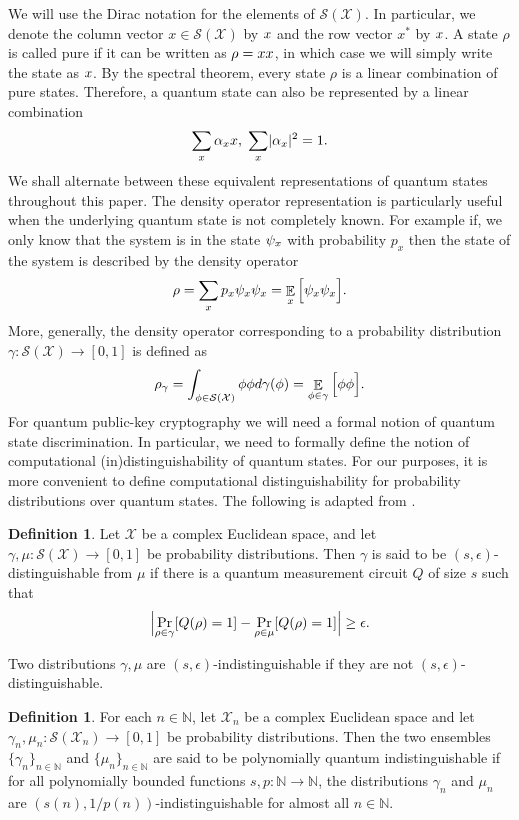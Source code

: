 \documentclass[11pt]{article}
\theoremstyle{plain}
\theoremstyle{definition}
\newtheorem{definition}[theorem]{Definition}
\DeclareMathOperator{\E}{\mathbb{E}}
\DeclarePairedDelimiter{\abs}{\lvert}{\rvert}
\let\ket\relax
\DeclarePairedDelimiter{\ket}{\lvert}{\rangle}
\let\bra\relax
\DeclarePairedDelimiter{\bra}{\langle}{\rvert}
\def\N{\mathbb{N}}
\def\X{\mathcal{X}}
\def\SX{\mathcal{S(X)}}
\begin{document}
We will use the Dirac notation for the elements of $\SX$. In particular, we denote the column vector $x \in \SX$ by $\ket{x}$ and the row vector $x^*$ by $\bra{x}$. A state $\rho$ is called pure if it can be written as $\rho = \ket{x}\bra{x}$, in which case we will simply write the state as $\ket{x}$. By the spectral theorem, every state $\rho$ is a linear combination of pure states. Therefore, a quantum state can also be represented by a linear combination
\[ \sum_{x} \alpha_x \ket{x}, \hspace*{1mm} \sum_{x} \abs{\alpha_x}^2 = 1. \]
We shall alternate between these equivalent representations of quantum states throughout this paper. The density operator representation is particularly useful when the underlying quantum state is not completely known. For example if, we only know that the system is in the state $\ket{\psi_x}$ with probability $p_x$ then the state of the system is described by the density operator
\[ \rho = \sum_{x} p_x \ket{\psi_x}\bra{\psi_x} = \E_x \Big[ \ket{\psi_x} \bra{\psi_x} \Big]. \]
More, generally, the density operator corresponding to a probability distribution $\gamma: \SX \rightarrow [0, 1]$ is defined as
\[ \rho_\gamma = \int_{\ket{\phi} \in \SX} \ket{\phi}\bra{\phi} d\gamma(\ket{\phi}) = \E_{\ket{\phi} \in \gamma} \Big[ \ket{\phi}\bra{\phi} \Big]. \]
For quantum public-key cryptography we will need a formal notion of quantum state discrimination. In particular, we need to formally define the notion of computational (in)distinguishability of quantum states. For our purposes, it is more convenient to define computational distinguishability for probability distributions over quantum states. The following is adapted from \cite[3.3]{watrous2009zero}.

\begin{definition}
    Let $\X$ be a complex Euclidean space, and let $\gamma, \mu: \SX \rightarrow [0, 1]$ be probability distributions. Then $\gamma$ is said to be $(s, \epsilon)$-distinguishable from $\mu$ if there is a quantum measurement circuit $Q$ of size $s$ such that
    \[ \abs[\Big]{ \Pr_{\rho \in \gamma}[Q(\rho) = 1] - \Pr_{\rho \in \mu}[Q(\rho) = 1]} \ge \epsilon. \]
\end{definition} 

Two distributions $\gamma, \mu$ are $(s, \epsilon)$-indistinguishable if they are not $(s, \epsilon)$-distinguishable.

\begin{definition}
    For each $n \in \N$, let $\X_n$ be a complex Euclidean space and let $\gamma_n, \mu_n: \mathcal{S}(\X_n) \rightarrow [0, 1]$ be probability distributions. Then the two ensembles $\{ \gamma_n \}_{n \in \N}$ and $\{ \mu_n \}_{n \in \N}$ are said to be polynomially quantum indistinguishable if for all polynomially bounded functions $s, p: \N \rightarrow \N$, the distributions $\gamma_n$ and $\mu_n$ are $(s(n), 1 / p(n))$-indistinguishable for almost all $n \in \N$.
\end{definition}
\end{document}
